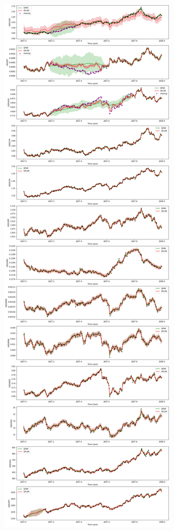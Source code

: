 \documentclass{article}
\begin{document}
\begin{figure}[H]
\centering
\includegraphics[width=.6\linewidth]{exchange-bidirectional-3.png}
\end{figure}
\end{document}
